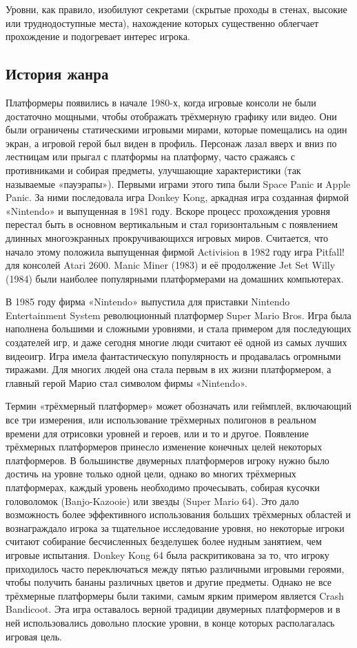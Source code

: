 Уровни, как правило, изобилуют секретами (скрытые проходы в стенах, высокие или труднодоступные места), нахождение которых существенно облегчает прохождение и подогревает интерес игрока.
\subsection{История жанра}
Платформеры появились в начале 1980-х, когда игровые консоли не были достаточно мощными, чтобы отображать трёхмерную графику или видео. Они были ограничены статическими игровыми мирами, которые помещались на один экран, а игровой герой был виден в профиль. Персонаж лазал вверх и вниз по лестницам или прыгал с платформы на платформу, часто сражаясь с противниками и собирая предметы, улучшающие характеристики (так называемые «пауэрапы»). Первыми играми этого типа были Space Panic и Apple Panic. За ними последовала игра Donkey Kong, аркадная игра созданная фирмой «Nintendo» и выпущенная в 1981 году. Вскоре процесс прохождения уровня перестал быть в основном вертикальным и стал горизонтальным с появлением длинных многоэкранных прокручивающихся игровых миров. Считается, что начало этому положила выпущенная фирмой Activision в 1982 году игра Pitfall! для консолей Atari 2600. Manic Miner (1983) и её продолжение Jet Set Willy (1984) были наиболее популярными платформерами на домашних компьютерах.

В 1985 году фирма «Nintendo» выпустила для приставки Nintendo Entertainment System революционный платформер Super Mario Bros. Игра была наполнена большими и сложными уровнями, и стала примером для последующих создателей игр, и даже сегодня многие люди считают её одной из самых лучших видеоигр. Игра имела фантастическую популярность и продавалась огромными тиражами. Для многих людей она стала первым в их жизни платформером, а главный герой Марио стал символом фирмы «Nintendo».

Термин «трёхмерный платформер» может обозначать или геймплей, включающий все три измерения, или использование трёхмерных полигонов в реальном времени для отрисовки уровней и героев, или и то и другое. Появление трёхмерных платформеров принесло изменение конечных целей некоторых платформеров. В большинстве двумерных платформеров игроку нужно было достичь на уровне только одной цели, однако во многих трёхмерных платформерах, каждый уровень необходимо прочесывать, собирая кусочки головоломок (Banjo-Kazooie) или звезды (Super Mario 64). Это дало возможность более эффективного использования больших трёхмерных областей и вознаграждало игрока за тщательное исследование уровня, но некоторые игроки считают собирание бесчисленных безделушек более нудным занятием, чем игровые испытания. Donkey Kong 64 была раскритикована за то, что игроку приходилось часто переключаться между пятью различными игровыми героями, чтобы получить бананы различных цветов и другие предметы. Однако не все трёхмерные платформеры были такими, самым ярким примером является Crash Bandicoot. Эта игра оставалось верной традиции двумерных платформеров и в ней использовались довольно плоские уровни, в конце которых располагалась игровая цель.


